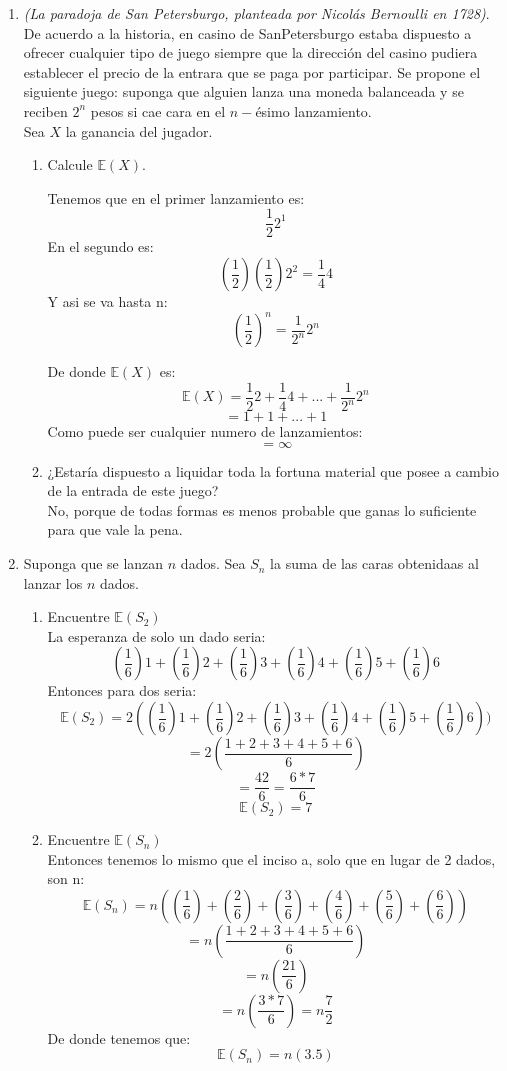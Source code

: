 \documentclass[12pt,a4paper]{report}
\begin{document}
\begin{enumerate}
		\item{
			\textit{(La paradoja de San Petersburgo, planteada por Nicolás
			Bernoulli en 1728)}.\\
			De acuerdo a la historia, en casino de SanPetersburgo estaba
			dispuesto a ofrecer cualquier tipo de juego siempre que la
			dirección del casino pudiera establecer el precio de la entrara
			que se paga por participar. Se propone el siguiente juego: suponga
			que alguien lanza una moneda balanceada y se reciben $2^n$ pesos
			si cae cara en el $n-$ésimo lanzamiento.\\
			Sea $X$ la ganancia del jugador.
			\begin{enumerate}
				\item {
				Calcule $\mathbb{E}(X)$.
				
				Tenemos que en el primer lanzamiento es:
				\[\frac{1}{2}2^{1}\]
				En el segundo es:
				\[(\frac{1}{2})(\frac{1}{2})2^{2} = \frac{1}{4}4\]
				Y asi se va hasta n:
				\[(\frac{1}{2})^{n} = \frac{1}{2^{n}}2^{n}\]
				}
				De donde $\mathbb{E}(X)$ es:
				\[\mathbb{E}(X) = \frac{1}{2}2 + \frac{1}{4}4 + ... +  \frac{1}{2^{n}}2^{n}\]
				\[= 1 + 1 + ... + 1\]
				Como puede ser cualquier numero de lanzamientos:
				\[= \infty\]

				\item {
				¿Estaría dispuesto a liquidar toda la fortuna material que
				posee a cambio de la entrada de este juego?\\
				No, porque de todas formas es menos probable que ganas lo suficiente para que vale la pena.
				}
			\end{enumerate}
		}

		\item{
			Suponga que se lanzan $n$ dados. Sea $S_n$ la suma de las caras
			obtenidaas al lanzar los $n$ dados.
			\begin{enumerate}
				\item {
					Encuentre $\mathbb{E}(S_2)$\\
					La esperanza de solo un dado seria:
					\[(\frac{1}{6})1 + (\frac{1}{6})2 + (\frac{1}{6})3 + (\frac{1}{6})4 + (\frac{1}{6})5 + (\frac{1}{6})6\]
					Entonces para dos seria:
					\[\mathbb{E}(S_2) = 2((\frac{1}{6})1 + (\frac{1}{6})2 + (\frac{1}{6})3 + (\frac{1}{6})4 + (\frac{1}{6})5 + (\frac{1}{6})6))\]
					\[= 2(\frac{1+2+3+4+5+6}{6})\]
					\[=\frac{42}{6} = \frac{6 * 7}{6}\]
					\[\mathbb{E}(S_2) = 7\]
				}

				\item {
					Encuentre $\mathbb{E}(S_n)$\\
					Entonces tenemos lo mismo que el inciso a, solo que en lugar de 2 dados, son n:
					\[\mathbb{E}(S_n) = n((\frac{1}{6}) + (\frac{2}{6}) + (\frac{3}{6})+ (\frac{4}{6}) + (\frac{5}{6}) + (\frac{6}{6}))\]
					\[= n(\frac{1+2+3+4+5+6}{6})\]
					\[= n(\frac{21}{6})\]
					\[= n(\frac{3 * 7}{6}) = n\frac{7}{2}\]
					De donde tenemos que:
					\[\mathbb{E}(S_n) = n(3.5)\]
				}
			\end{enumerate}
		}


\end{enumerate}
\end{document}
